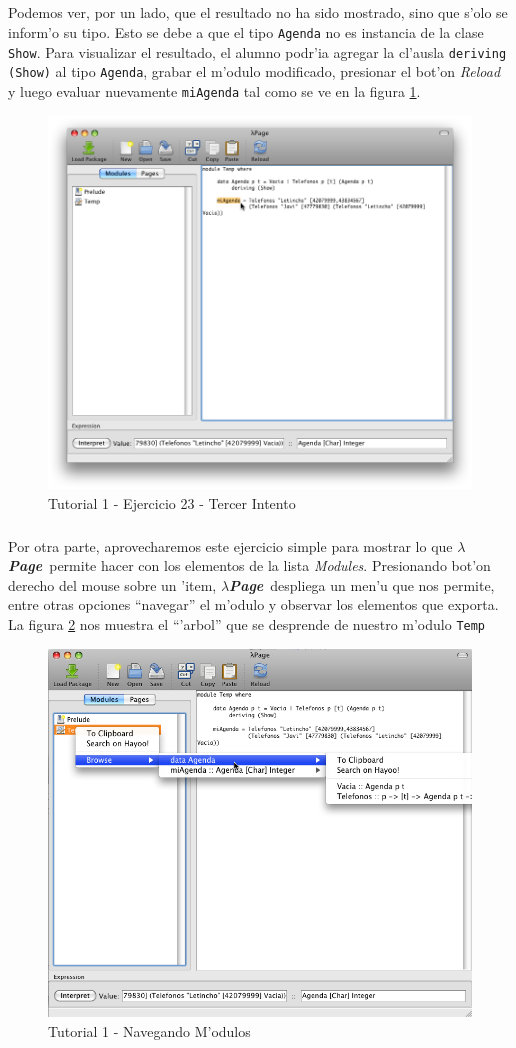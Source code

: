 \documentclass[a4paper]{article}
\newcommand{\hpage}{\textbf{\textsl{$\lambda$Page}}}
\begin{document}
\subparagraph{}Podemos ver, por un lado, que el resultado no ha sido mostrado, sino que s'olo se inform'o su tipo.  Esto se debe a que el tipo \texttt{Agenda} no es instancia de la clase \texttt{Show}.  Para visualizar el resultado, el alumno podr'ia agregar la cl'ausla \texttt{deriving (Show)} al tipo \texttt{Agenda}, grabar el m'odulo modificado, presionar el bot'on \textsl{Reload} y luego evaluar nuevamente \texttt{miAgenda} tal como se ve en la figura \ref{tut112}.
\begin{figure}[hp]
	\begin{center}
        	\includegraphics[width=.75\textwidth]{pictures/tut1/12}
		\caption{Tutorial 1 - Ejercicio 23 - Tercer Intento}
		\label{tut112}
	\end{center}
\end{figure}
\subparagraph{}Por otra parte, aprovecharemos este ejercicio simple para mostrar lo que \hpage\ permite hacer con los elementos de la lista \textsl{Modules}.  Presionando bot'on derecho del mouse sobre un 'item, \hpage\ despliega un men'u que nos permite, entre otras opciones ``navegar''  el m'odulo y observar los elementos que exporta.  La figura \ref{tut113} nos muestra el ``'arbol'' que se desprende de nuestro m'odulo \texttt{Temp}
\begin{figure}[hp]
	\begin{center}
        	\includegraphics[width=.75\textwidth]{pictures/tut1/13}
		\caption{Tutorial 1 - Navegando M'odulos}
		\label{tut113}
	\end{center}
\end{figure}
\end{document}
